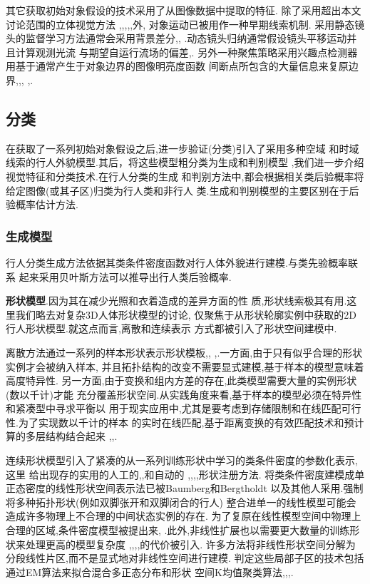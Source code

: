 \documentclass[10pt,letterpaper,journal,compsoc]{IEEEtran}
\begin{document}
其它获取初始对象假设的技术采用了从图像数据中提取的特征.
除了采用超出本文讨论范围的立体视觉方法\cite{bib2}
,\cite{bib7},\cite{bib16},\cite{bib23},\cite{bib50},\cite{bib81}外,
对象运动已被用作一种早期线索机制.
采用静态镜头的监督学习方法通常会采用背景差分\cite{bib51},\cite{bib66},
\cite{bib82}.动态镜头归纳通常假设镜头平移运动并且计算观测光流
与期望自运行流场的偏差\cite{bib15},\cite{bib56}.
另外一种聚焦策略采用兴趣点检测器用基于通常产生于对象边界的图像明亮度函数
间断点所包含的大量信息来复原边界\cite{bib1},\cite{bib39},\cite{bib40},
\cite{bib42},\cite{bib61}.
\subsection{分类}
在获取了一系列初始对象假设之后,进一步验证(分类)引入了采用多种空域
和时域线索的行人外貌模型.其后，将这些模型粗分类为生成和判别模型
\cite{bib72},我们进一步介绍视觉特征和分类技术.在行人分类的生成
和判别方法中,都会根据相关类后验概率将给定图像(或其子区)归类为行人类和非行人
类.生成和判别模型的主要区别在于后验概率估计方法.
\subsubsection{生成模型}
行人分类生成方法依据其类条件密度函数对行人体外貌进行建模.与类先验概率联系
起来采用贝叶斯方法可以推导出行人类后验概率.

\textbf{形状模型}.因为其在减少光照和衣着造成的差异方面的性
质,形状线索极其有用.这里我们略去对复杂3D人体形状模型\cite{bib21}的讨论,
仅聚焦于从形状轮廓实例中获取的2D行人形状模型.就这点而言,离散和连续表示
方式都被引入了形状空间建模中.

离散方法通过一系列的样本形状表示形状模板\cite{bib22},\cite{bib23},
\cite{bib67},\cite{bib70}.一方面,由于只有似乎合理的形状实例才会被纳入样本,
并且拓扑结构的改变不需要显式建模,基于样本的模型意味着高度特异性.
另一方面,由于变换和组内方差的存在,此类模型需要大量的实例形状(数以千计)才能
充分覆盖形状空间.从实践角度来看,基于样本的模型必须在特异性和紧凑型中寻求平衡以
用于现实应用中,尤其是要考虑到存储限制和在线匹配可行性.为了实现数以千计的样本
的实时在线匹配,基于距离变换的有效匹配技术和预计算的多层结构结合起来
\cite{bib22},\cite{bib23},\cite{bib67}.

连续形状模型引入了紧凑的从一系列训练形状中学习的类条件密度的参数化表示,这里
给出现存的实用的人工的\cite{bib9},\cite{bib25},\cite{bib26}和自动的
\cite{bib4},\cite{bib5},\cite{bib14},\cite{bib34},\cite{bib50}形状注册方法.
将类条件密度建模成单正态密度的线性形状空间表示法已被Baumberg\cite{bib4}和Bergtholdt
以及其他人采用\cite{bib9}.强制将多种拓扑形状(例如双脚张开和双脚闭合的行人)
整合进单一的线性模型可能会造成许多物理上不合理的中间状态实例的存在.
为了复原在线性模型空间中物理上合理的区域,条件密度模型被提出来\cite{bib9},
\cite{bib14}.此外,非线性扩展也以需要更大数量的训练形状来处理更高的模型复杂度
\cite{bib9},\cite{bib14},\cite{bib25},\cite{bib26},\cite{bib50}的代价被引入.
许多方法将非线性形状空间分解为分段线性片区,而不是显式地对非线性空间进行建模.
判定这些局部子区的技术包括通过EM算法来拟合混合多正态分布\cite{bib9}和形状
空间K均值聚类算法\cite{bib14},\cite{bib25},\cite{bib26},\cite{bib50}.
\end{document}
